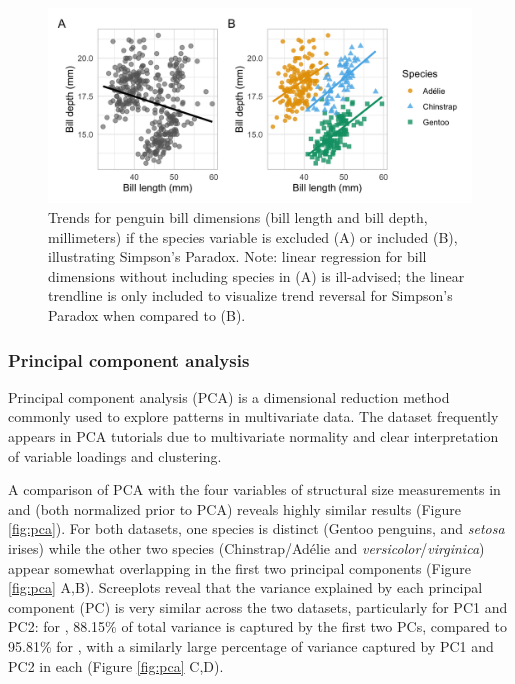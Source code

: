 \begin{Schunk}
\begin{figure}[htbp]

{\centering \includegraphics[width=\textwidth]{figs/simpsons-1} 

}

\caption[Trends for penguin bill dimensions (bill length and bill depth, millimeters) if the species variable is excluded (A) or included (B), illustrating Simpson’s Paradox]{Trends for penguin bill dimensions (bill length and bill depth, millimeters) if the species variable is excluded (A) or included (B), illustrating Simpson’s Paradox. Note: linear regression for bill dimensions without including species in (A) is ill-advised; the linear trendline is only included to visualize trend reversal for Simpson’s Paradox when compared to (B).}\label{fig:simpsons}
\end{figure}
\end{Schunk}

\hypertarget{principal-component-analysis}{%
\subsubsection{Principal component
analysis}\label{principal-component-analysis}}

Principal component analysis (PCA) is a dimensional reduction method
commonly used to explore patterns in multivariate data. The 
dataset frequently appears in PCA tutorials due to multivariate
normality and clear interpretation of variable loadings and clustering.

A comparison of PCA with the four variables of structural size
measurements in  and  (both normalized prior
to PCA) reveals highly similar results (Figure \ref{fig:pca}). For both
datasets, one species is distinct (Gentoo penguins, and \emph{setosa}
irises) while the other two species (Chinstrap/Adélie and
\emph{versicolor}/\emph{virginica}) appear somewhat overlapping in the
first two principal components (Figure \ref{fig:pca} A,B). Screeplots
reveal that the variance explained by each principal component (PC) is
very similar across the two datasets, particularly for PC1 and PC2: for
, 88.15\% of total variance is captured by the first two
PCs, compared to 95.81\% for , with a similarly large
percentage of variance captured by PC1 and PC2 in each (Figure
\ref{fig:pca} C,D).


